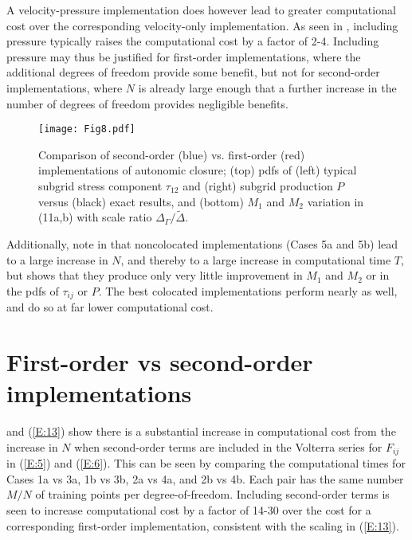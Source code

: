 A velocity-pressure implementation does however lead to greater computational cost over the corresponding velocity-only implementation. As seen in , including pressure typically raises the computational cost by a factor of 2-4. Including pressure may thus be justified for first-order implementations, where the additional degrees of freedom provide some benefit, but not for second-order implementations, where $N$ is already large enough that a further increase in the number of degrees of freedom provides negligible benefits.

%
\begin{figure}
	\begin{center}
	\texttt{[image: Fig8.pdf]}
	\caption{ Comparison of second-order (blue) vs. first-order (red) implementations of autonomic closure; (top) pdfs of (left) typical subgrid stress component $\tau_{12}$ and (right) subgrid production $P$ versus (black) exact results, and (bottom) $M_1$ and $M_2$ variation in (11a,b) with scale ratio $\Delta_{\Gamma}/\widetilde{\Delta}$.}
	\label{F:8}
	\end{center}
\end{figure}
%

Additionally, note in  that noncolocated implementations (Cases 5a and 5b) lead to a large increase in $N$, and thereby to a large increase in computational time $T$, but  shows that they produce only very little improvement in  $M_1$ and $M_2$  or in the pdfs of  $\tau_{ij}$ or $P$. The best colocated implementations perform nearly as well, and do so at far lower computational cost.

\section{First-order vs second-order implementations}
\label{sec:IVD}

 and (\ref{E:13}) show there is a substantial increase in computational cost from the increase in $N$ when second-order terms are included in the Volterra series for  $F_{ij}$ in (\ref{E:5}) and (\ref{E:6}). This can be seen by comparing the computational times for Cases 1a vs 3a, 1b vs 3b, 2a vs 4a, and 2b vs 4b. Each pair has the same number  $M/N$ of training points per degree-of-freedom. Including second-order terms is seen to increase computational cost by a factor of 14-30 over the cost for a corresponding first-order implementation, consistent with the scaling in (\ref{E:13}).  

